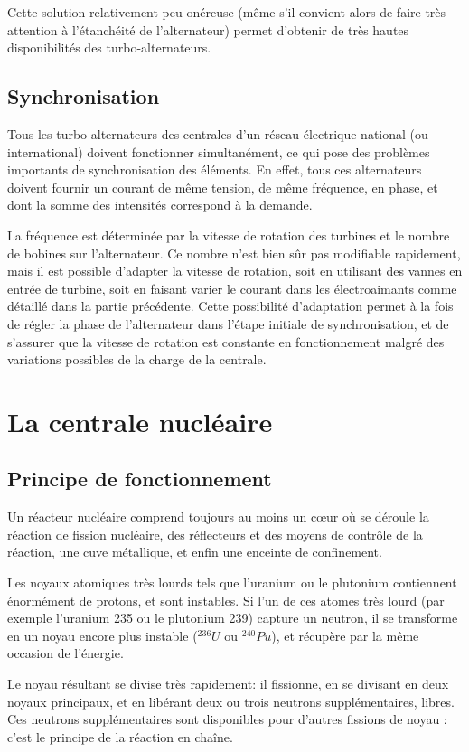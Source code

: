\documentclass[12pt,a4paper,oneside,openany]{memoir}
\begin{document}
Cette solution relativement peu onéreuse (même s'il convient alors de faire très attention à l'étanchéité de l'alternateur) permet d'obtenir de très hautes disponibilités des turbo-alternateurs.


\section{Synchronisation}
Tous les turbo-alternateurs des centrales d'un réseau électrique national (ou international) doivent fonctionner simultanément, ce qui pose des problèmes importants de synchronisation des éléments. En effet, tous ces alternateurs doivent fournir un courant de même tension, de même fréquence, en phase, et dont la somme des intensités correspond à la demande.

La fréquence est déterminée par la vitesse de rotation des turbines et le nombre de bobines sur l'alternateur. Ce nombre n'est bien sûr pas modifiable rapidement, mais il est possible d'adapter la vitesse de rotation, soit en utilisant des vannes en entrée de turbine, soit en faisant varier le courant dans les électroaimants comme détaillé dans la partie précédente. Cette possibilité d'adaptation permet à la fois de régler la phase de l'alternateur dans l'étape initiale de synchronisation, et de s'assurer que la vitesse de rotation est constante en fonctionnement malgré des variations possibles de la charge de la centrale.


\chapter{La centrale nucléaire}

\section{Principe de fonctionnement}
Un réacteur nucléaire comprend toujours au moins un cœur où se déroule la réaction de fission nucléaire, des réflecteurs et des moyens de contrôle de la réaction, une cuve métallique, et enfin une enceinte de confinement.


Les noyaux atomiques très lourds tels que l'uranium ou le plutonium contiennent énormément de protons, et sont instables. Si l'un de ces atomes très lourd (par exemple l'uranium 235 ou le plutonium 239) capture un neutron, il se transforme en un noyau encore plus instable (${}^{236}U$ ou ${}^{240}Pu$), et récupère par la même occasion de l'énergie.

Le noyau résultant se divise très rapidement: il fissionne, en se divisant en deux noyaux principaux, et en libérant deux ou trois neutrons supplémentaires, libres. Ces neutrons supplémentaires sont disponibles pour d'autres fissions de noyau : c'est le principe de la réaction en chaîne.
\end{document}
